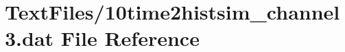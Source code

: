 \hypertarget{10time2histsim__channel3_8dat}{}\section{Text\+Files/10time2histsim\+\_\+channel3.dat File Reference}
\label{10time2histsim__channel3_8dat}
